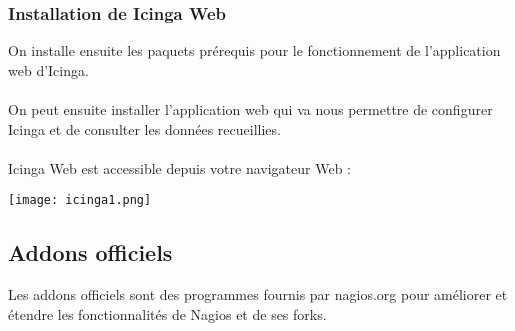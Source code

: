 		\subsubsection{Installation de Icinga Web}
			\vspace{0.3cm}
			
			On installe ensuite les paquets prérequis pour le fonctionnement de l'application web d'Icinga.\\
			
			\\
			
			On peut ensuite installer l'application web qui va nous permettre de configurer Icinga et de consulter les données recueillies.\\
			
			\\
			
			Icinga Web est accessible depuis votre navigateur Web :\\
			
			\begin{center}
			 \texttt{[image: icinga1.png]} 
			 \end{center}
			 
	\subsection{Addons officiels}
		
		Les addons officiels sont des programmes fournis par nagios.org pour améliorer et étendre les fonctionnalités de Nagios et de ses forks.\\
	
